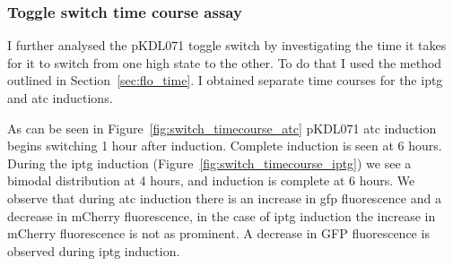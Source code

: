 \clearpage





\subsubsection{Toggle switch time course assay}
\label{sec:ts_time}
I further analysed the pKDL071 toggle switch by investigating the time it takes for it to switch from one high state to the other. To do that I used the method outlined in Section~\ref{sec:flo_time}. I obtained separate time courses for the \acrshort{iptg} and \acrshort{atc} inductions. 

As can be seen in Figure~\ref{fig:switch_timecourse_atc} pKDL071 \acrshort{atc}  induction begins switching 1 hour after induction. Complete induction is seen at 6 hours. During the \acrshort{iptg} induction (Figure~\ref{fig:switch_timecourse_iptg}) we see a bimodal distribution at 4 hours, and induction is complete at 6 hours. We observe that during \acrshort{atc} induction there is an increase in \acrshort{gfp} fluorescence and a decrease in mCherry fluorescence, in the case of \acrshort{iptg} induction the increase in mCherry fluorescence is not as prominent. A decrease in GFP fluorescence is observed during \acrshort{iptg} induction. 

